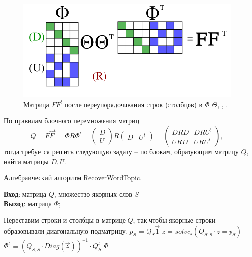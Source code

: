 \documentclass[a4paper, 14pt]{extarticle}
\begin{document}
\begin{figure}
		\centering \includegraphics[scale=0.45]{img/anch_6} 
		\caption{Матрица $FF^t$ после переупорядочивания строк (столбцов) в $\Phi, \Theta$, \cite{AnkurMoitraSlides}, \cite{Arora12}.}
		\label{anch_6}
\end{figure}
 
По правилам блочного перемножения матриц
 	\begin{equation}
		Q = F\hat{F}^t = \Phi R \Phi^t= \begin{pmatrix}
		D\\
		U\end{pmatrix} R \begin{pmatrix}
		D & U^t\end{pmatrix}= \begin{pmatrix}
		DRD & DRU^t\\
		URD & URU^t
		\end{pmatrix},
 	\label{bm}
 	\end{equation}
тогда требуется решить следующую задачу -- по блокам, образующим матрицу $Q$, найти матрицы $D, U$.



   	\begin{singlespacing}
   		\begin{algorithm}
   		\caption{Алгебраический алгоритм RecoverWordTopic.}
   		\label{plsa}
   			\textbf{Вход}: матрица $Q$, множество якорных слов $S$\\
   			\textbf{Выход}: матрица $\Phi$; 
   		\begin{algorithmic}[1]
   				\State Переставим строки и столбцы в матрице $Q$, так чтобы якорные строки образовывали диагональную подматрицу.
   				\State $p_{S}$ = $Q_{S}\vec{1}$
   				\State $z$ = $solve_{z}(Q_{S,S}\cdot z = p_{S})$
   				\State $\Phi^t$ = $(Q_{S,S} \cdot Diag(\vec{z}))^{-1} \cdot Q_{S}^t$
   				\State \Return $\Phi$
   		\end{algorithmic}
   		\end{algorithm}
   	\end{singlespacing}
   	
\end{document}
